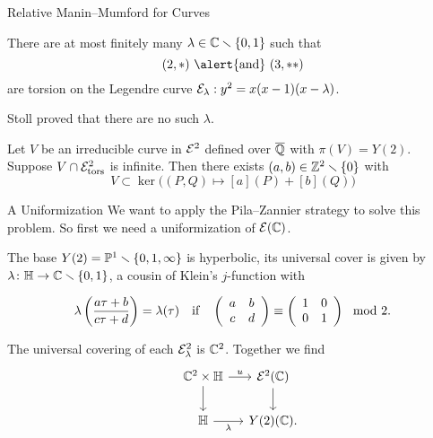 \documentclass{beamer}
\begin{document}
\begin{frame}{Relative Manin--Mumford for Curves}
  
  \begin{theorem}
    There are at most finitely many $\lambda\in{\mathbb{C}}\smallsetminus\{0,1\}$ such
    that
    \begin{equation*}
      (2,*) \text{ \alert{and} } (3,**)
    \end{equation*}
    are torsion on the Legendre curve ${\mathcal E}_\lambda : y^2 =
    x(x-1)(x-\lambda)$. 
  \end{theorem}

  Stoll proved that there are \alert{no} such $\lambda$.

  \begin{theorem}
    Let $V$ be an irreducible curve in ${\mathcal E}^2$ defined over ${\overline{\mathbb{Q}}}$ with
    $\pi(V)=Y(2)$.
    Suppose $V\cap {\mathcal E}^2_{\mathrm{tors}}$ is
    \alert{infinite}.
    Then there exists $(a,b)\in{\mathbb{Z}}^2\smallsetminus\{0\}$ with
    \begin{equation*}
      V \subset \ker{\bigl((P,Q)\mapsto [a](P)+[b](Q)\bigr)} 
    \end{equation*}    
  \end{theorem} 
\end{frame}

\begin{frame}{A Uniformization}
  We want to apply the Pila--Zannier strategy to solve this problem.
  So first we need a uniformization of ${\mathcal E}({\mathbb{C}})$.

  The base $Y(2) ={\mathbb{P}}^{1}\smallsetminus\{0,1,\infty\}$ is hyperbolic, its
  universal cover is given by  $\lambda\colon {\mathbb{H}}\rightarrow
  {\mathbb{C}}\smallsetminus\{0,1\}$, a cousin of Klein's $j$-function with

  \begin{equation*}
        \lambda\left(\frac{a\tau+b}{c\tau +d}\right) =
        \lambda(\tau)\quad\text{if}\quad
    \left( \begin{array}{cc} {a} & {b} \\ {c} & {d} \end{array} \right)   \equiv \left( \begin{array}{cc} {1} & {0} \\ {0} & {1} \end{array} \right) \mod 2.
  \end{equation*}
  
  The universal covering of each ${\mathcal E}^2_\lambda$ is ${\mathbb{C}}^2$.   Together we find
  \begin{equation*}
    \begin{tikzcd}[ampersand replacement=\&,column sep=small, row sep=small] 
      \& \IC^2\times\IH  \arrow{dd}{} \arrow{r}{u} \& \cE^2(\IC)\arrow{dd}{}\\
      \&  \&\\
      \&    \IH \arrow[swap]{r}{\lambda}  \& Y(2)(\IC).
    \end{tikzcd}
  \end{equation*}

\end{frame}
\end{document}
